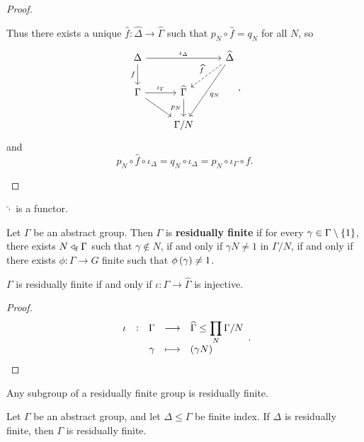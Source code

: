 \begin{proof}
\begin{enumerate}[leftmargin=0.5in, label=Case \arabic*.]
Thus there exists a unique $ \widehat{f} : \widehat{\Delta} \to \widehat{\Gamma} $ such that $ p_N \circ \widehat{f} = q_N $ for all $ N $, so
$$
\begin{tikzcd}
\Delta \arrow{rr}{\iota_\Delta} \arrow{d}[swap]{f} & & \widehat{\Delta} \arrow[dashed]{dl}[swap]{\widehat{f}} \arrow{ddl}{q_N} \\
\Gamma \arrow{r}{\iota_\Gamma} \arrow{dr} & \widehat{\Gamma} \arrow{d}[swap]{p_N} & \\
& \Gamma / N &
\end{tikzcd},
$$
and
$$ p_N \circ \widehat{f} \circ \iota_\Delta = q_N \circ \iota_\Delta = p_N \circ \iota_\Gamma \circ f. $$
\end{enumerate}
\end{proof}

\begin{corollary}
$ \widehat{\cdot} $ is a functor.
\end{corollary}

\pagebreak


\begin{definition}
Let $ \Gamma $ be an abstract group. Then $ \Gamma $ is \textbf{residually finite} if for every $ \gamma \in \Gamma \setminus \cbr{1} $, there exists $ N \triangleleft_{\mathrm{f}} \Gamma $ such that $ \gamma \notin N $, if and only if $ \gamma N \ne 1 $ in $ \Gamma / N $, if and only if there exists $ \phi : \Gamma \to G $ finite such that $ \phi\br{\gamma} \ne 1 $.
\end{definition}

\begin{proposition}
$ \Gamma $ is residually finite if and only if $ \iota : \Gamma \to \widehat{\Gamma} $ is injective.
\end{proposition}

\begin{proof}
$$ \function[\iota]{\Gamma}{\widehat{\Gamma} \le \prod_N \Gamma / N}{\gamma}{\br{\gamma N}}. $$
\end{proof}

\begin{proposition}
Any subgroup of a residually finite group is residually finite.
\end{proposition}

\begin{proposition}
Let $ \Gamma $ be an abstract group, and let $ \Delta \le \Gamma $ be finite index. If $ \Delta $ is residually finite, then $ \Gamma $ is residually finite.
\end{proposition}


